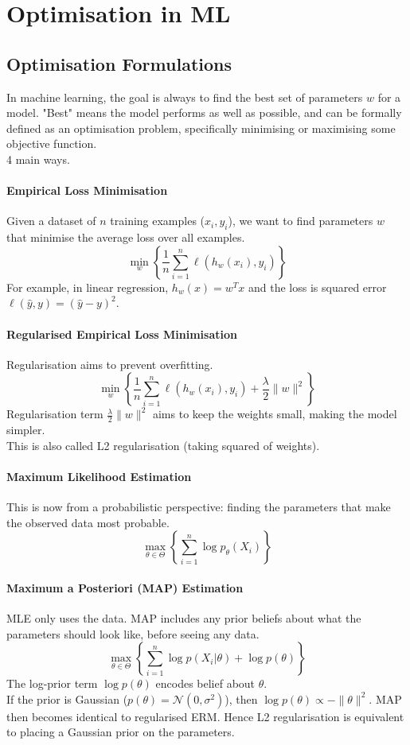 \documentclass[../Probability.tex]{subfiles}
\begin{document}
\section{Optimisation in ML}
\subsection{Optimisation Formulations}
In machine learning, the goal is always to find the best set of parameters $w$ for a model.
"Best" means the model performs as well as possible, and can be formally defined as an optimisation problem, specifically minimising or maximising some objective function.\\
4 main ways.

\paragraph{Empirical Loss Minimisation}
Given a dataset of $n$ training examples ($x_i, y_i$), we want to find parameters $w$ that minimise the average loss over all examples.
$$\min_w \left\{ \frac{1}{n} \sum_{i=1}^{n} \ell(h_w(x_i), y_i) \right\}$$
For example, in linear regression, $h_w(x)=w^T x$ and the loss is squared error $\ell(\hat{y},y)=(\hat{y}-y)^2$.

\paragraph{Regularised Empirical Loss Minimisation}
Regularisation aims to prevent overfitting.
$$\min_w \left\{ \frac{1}{n} \sum_{i=1}^{n} \ell(h_w(x_i), y_i) + \frac{\lambda}{2} \|w\|^2 \right\}$$
Regularisation term $\frac{\lambda}{2} \|w\|^2$ aims to keep the weights small, making the model simpler.\\
This is also called L2 regularisation (taking squared of weights).

\paragraph{Maximum Likelihood Estimation}
This is now from a probabilistic perspective: finding the parameters that make the observed data most probable.
$$\max_{\theta \in \Theta} \left\{ \sum_{i=1}^{n} \log p_\theta(X_i) \right\}$$

\paragraph{Maximum a Posteriori (MAP) Estimation}
MLE only uses the data. MAP includes any prior beliefs about what the parameters should look like, before seeing any data.
$$\max_{\theta \in \Theta} \left\{ \sum_{i=1}^{n} \log p(X_i | \theta) + \log p(\theta) \right\}$$
The log-prior term $\log p(\theta)$ encodes belief about $\theta$.\\
If the prior is Gaussian ($p(\theta) = \mathcal{N}(0,\sigma^2)$), then $\log p(\theta) \propto -\|\theta\|^2$. MAP then becomes identical to regularised ERM.
Hence L2 regularisation is equivalent to placing a Gaussian prior on the parameters.
\end{document}
